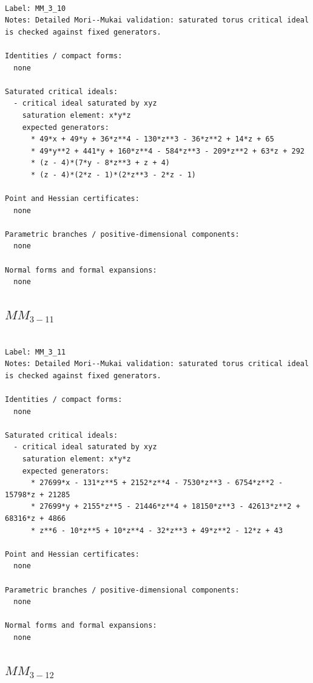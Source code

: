 \documentclass[10pt,a4paper]{article}
\begin{document}
\begin{lstlisting}

Label: MM_3_10
Notes: Detailed Mori--Mukai validation: saturated torus critical ideal is checked against fixed generators.

Identities / compact forms:
  none

Saturated critical ideals:
  - critical ideal saturated by xyz
    saturation element: x*y*z
    expected generators:
      * 49*x + 49*y + 36*z**4 - 130*z**3 - 36*z**2 + 14*z + 65
      * 49*y**2 + 441*y + 160*z**4 - 584*z**3 - 209*z**2 + 63*z + 292
      * (z - 4)*(7*y - 8*z**3 + z + 4)
      * (z - 4)*(2*z - 1)*(2*z**3 - 2*z - 1)

Point and Hessian certificates:
  none

Parametric branches / positive-dimensional components:
  none

Normal forms and formal expansions:
  none

\end{lstlisting}

\subsection*{$ MM_{3-11} $}

\begin{lstlisting}

Label: MM_3_11
Notes: Detailed Mori--Mukai validation: saturated torus critical ideal is checked against fixed generators.

Identities / compact forms:
  none

Saturated critical ideals:
  - critical ideal saturated by xyz
    saturation element: x*y*z
    expected generators:
      * 27699*x - 131*z**5 + 2152*z**4 - 7530*z**3 - 6754*z**2 - 15798*z + 21285
      * 27699*y + 2155*z**5 - 21446*z**4 + 18150*z**3 - 42613*z**2 + 68316*z + 4866
      * z**6 - 10*z**5 + 10*z**4 - 32*z**3 + 49*z**2 - 12*z + 43

Point and Hessian certificates:
  none

Parametric branches / positive-dimensional components:
  none

Normal forms and formal expansions:
  none

\end{lstlisting}

\subsection*{$ MM_{3-12} $}
\end{document}
